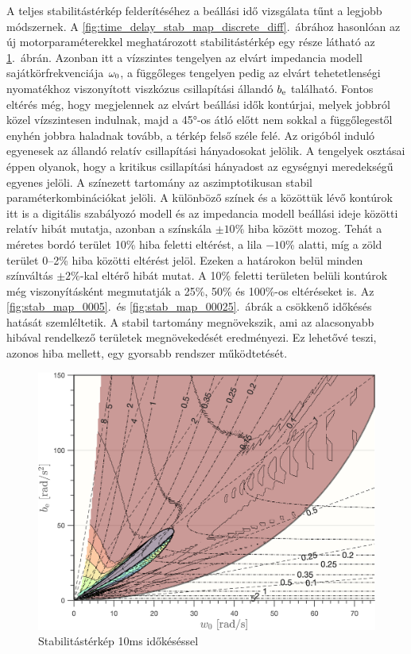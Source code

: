 A teljes stabilitástérkép felderítéséhez a beállási idő vizsgálata tűnt a legjobb módszernek.
A \ref{fig:time_delay_stab_map_discrete_diff}.~ábrához hasonlóan az új motorparaméterekkel meghatározott stabilitástérkép egy része látható az \ref{fig:stab_map_001}.~ábrán.
Azonban itt a vízszintes tengelyen az elvárt impedancia modell sajátkörfrekvenciája \(\omega_{\mathrm{0}}\), a függőleges 
tengelyen pedig az elvárt tehetetlenségi nyomatékhoz viszonyított viszkózus csillapítási állandó \(b_{\mathrm{e}}\) található.
Fontos eltérés még, hogy megjelennek az elvárt beállási idők kontúrjai, melyek jobbról közel vízszintesen indulnak, 
majd a 45°-os átló előtt nem sokkal a függőlegestől enyhén jobbra haladnak tovább, a térkép felső széle felé. 
Az origóból induló egyenesek az állandó relatív csillapítási hányadosokat jelölik. A tengelyek osztásai éppen olyanok, 
hogy a kritikus csillapítási hányadost az egységnyi meredekségű egyenes jelöli. A színezett tartomány az aszimptotikusan 
stabil paraméterkombinációkat jelöli. A különböző színek és a közöttük lévő kontúrok itt is a digitális szabályozó modell és az 
impedancia modell beállási ideje közötti relatív hibát mutatja, azonban a színskála \(\pm 10\%\) hiba között mozog. 
Tehát a méretes bordó terület 10\% hiba feletti eltérést, a lila $-10$\% alatti, míg a zöld terület 0--2\% hiba közötti 
eltérést jelöl. Ezeken a határokon belül minden színváltás \(\pm2\%\)-kal eltérő hibát mutat. A 10\% feletti 
területen belüli kontúrok még viszonyításként megmutatják a 25\%, 50\% és 100\%-os eltéréseket is. 
Az \ref{fig:stab_map_0005}.~és \ref{fig:stab_map_00025}.~ábrák a csökkenő időkésés hatását szemléltetik. 
A stabil tartomány megnövekszik, ami az alacsonyabb hibával rendelkező területek 
megnövekedését eredményezi. Ez lehetővé teszi, azonos hiba mellett, egy gyorsabb rendszer működtetését. 

\begin{figure}[b!]
    \begin{center}
    \includegraphics[width=14cm]{images/stab_map_001.png}
    \caption{Stabilitástérkép 10ms időkéséssel}\label{fig:stab_map_001}
    \end{center}
\end{figure}

